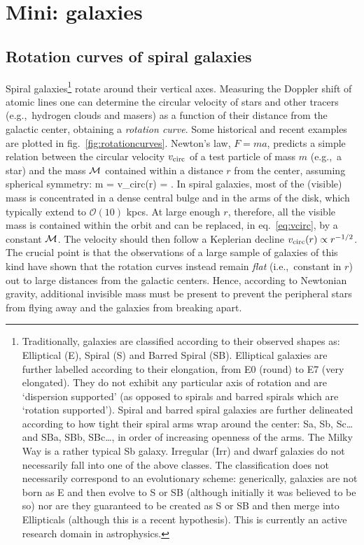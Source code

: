 \section{Mini: galaxies}\label{sec:evidencesmini}

\subsection{Rotation curves of spiral galaxies}\label{sec:rotatiocurves}
Spiral galaxies\footnote{Traditionally, galaxies are classified according to their observed shapes as: Elliptical (E), Spiral (S) and Barred Spiral (SB). Elliptical galaxies are further labelled according to their elongation, from E0 (round) to E7 (very elongated). They do not exhibit any particular axis of rotation and are `dispersion supported' (as opposed to spirals and barred spirals which are `rotation supported'). Spiral and barred spiral galaxies are further delineated according to how tight their spiral arms wrap around the center: Sa, Sb, Sc\ldots and SBa, SBb, SBc\ldots, in order of increasing openness of the arms.  The Milky Way is a rather typical Sb galaxy. Irregular (Irr) and dwarf galaxies do not necessarily fall into one of the above classes. The classification does not necessarily correspond to an evolutionary scheme: generically, galaxies are not  born as E and then evolve to S or SB (although initially it was believed to be so) nor are they guaranteed to be created as S or SB and then merge into Ellipticals (although this is a recent hypothesis). This is currently an active research domain in astrophysics.}
rotate around their vertical axes. Measuring the Doppler shift of atomic lines one can determine the circular velocity of stars and other tracers (e.g.,~hydrogen clouds and masers) as a function of their distance from the galactic center, obtaining
a {\em rotation curve}. Some historical and recent examples are plotted in fig.~\ref{fig:rotationcurves}. 
Newton's law, $F=ma$, predicts a simple relation between the circular velocity $v_{\rm circ}$ of a test particle of mass $m$ (e.g.,~a star) and the mass ${\cal M}$ contained within a distance $r$ from the center, assuming spherical symmetry:
\beq\label{eq:vcirc}
m  =  
\qquad\Rightarrow\qquad
v_{\rm circ}(r) = .
\eeq
In spiral galaxies, most of the (visible) mass is concentrated in a dense central bulge and in the arms of the disk, which typically extend to $\mathcal{O}(10)$ kpcs. At large enough $r$, therefore, all the visible mass is contained within the orbit and can be replaced, in eq.~\eqref{eq:vcirc}, by a constant $ {\cal M}$.  
The velocity should then follow a Keplerian decline $v_{\rm circ}(r) \propto r^{-1/2}$.
The crucial point is that  the observations of a large sample of galaxies of this kind have shown that the rotation curves instead remain {\em flat} (i.e.,~constant in $r$) out to large distances from the galactic centers. Hence, according to
Newtonian gravity,
additional invisible mass must be present to prevent the peripheral stars from flying away and the galaxies from breaking apart. 

